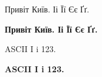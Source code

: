 \documentclass[10pt]{article}
\begin{document}
\noindent Привіт Київ. Іі Її Єє Ґґ.\par
\noindent \textbf{Привіт Київ. Іі Її Єє Ґґ.}
\par
{\selectfont
\noindent ASCII I i 123.\par
\noindent \textbf{ASCII I i 123.}\par}
\end{document}
